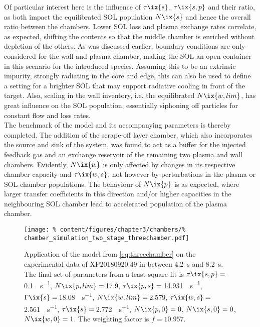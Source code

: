 %
            Of particular interest here is the influence of $\tau\ix{s}$, $\tau\ix{s,p}$ and their ratio, as both impact the equilibrated SOL population $N\ix{s}$ and hence the overall ratio between the chambers. Lower SOL loss  and plasma exchange rates correlate, as expected, shifting the contents so that the middle chamber is enriched without depletion of the others. As was discussed earlier, boundary conditions are only considered for the wall and plasma chamber, making the SOL an open container in this scenario for the introduced species. Assuming this to be an extrinsic impurity, strongly radiating in the core and edge, this can also be used to define a setting for a brighter SOL that may support radiative cooling in front of the target. Also, scaling in the wall inventory, i.e. the equilibrated $N\ix{w,lim}$, has great influence on the SOL population, essentially siphoning off particles for constant flow and loss rates.\\%
            The benchmark of the model and its accompanying parameters is thereby completed. The addition of the scrape-off layer chamber, which also incorporates the source and sink of the system, was found to act as a buffer for the injected feedback gas and an exchange reservoir of the remaining two plasma and wall chambers. Evidently, $N\ix{w}$ is only affected by changes in its respective chamber capacity and $\tau\ix{w,s}$, not however by perturbations in the plasma or SOL chamber populations. The behaviour of $N\ix{p}$ is as expected, where larger transfer coefficients in this direction and/or higher capacities in the neighbouring SOL chamber lead to accelerated population of the plasma chamber.\\%
%
            \begin{figure}[t]%
                \centering%
                \texttt{[image: \%
                    content/figures/chapter3/chambers/\%
                    chamber\_simulation\_two\_stage\_threechamber.pdf]}%
                \caption{Application of the model from \cref{eq:threechamber} on the experimental data of XP20180920.49 in-between \SI{4.2}{\second} and \SI{8.2}{\second}. The final set of parameters from a least-square fit is $\tau\ix{s,p}=$\,\SI{0.1}{\arbitraryunit\per\second}, $N\ix{p,lim}=$\,\SI{17.9}{\arbitraryunit}, $\tau\ix{p,s}=$\,\SI{14.931}{\arbitraryunit\per\second}, $\Gamma\ix{s}=$\,\SI{18.08}{\arbitraryunit\per\second},  $N\ix{w,lim}=$\,\SI{2.579}{\arbitraryunit}, $\tau\ix{w,s}=$\,\SI{2.561}{\arbitraryunit\per\second}, $\tau\ix{s}=$\,\SI{2.772}{\arbitraryunit\per\second}, $N\ix{p,0}=0$, $N\ix{s,0}=0$, $N\ix{w,0}=1$. The weighting factor is $f=10.957$.}\label{fig:threechamber_twostage}%
            \end{figure}%
